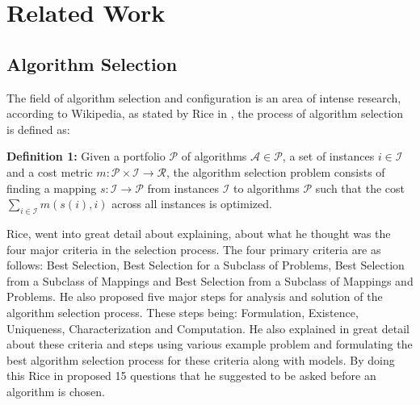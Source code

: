 \fi

\section{Related Work}

\subsection*{Algorithm Selection}

The field of algorithm selection and configuration is an area of intense research, according to Wikipedia, as stated by Rice in \citep{rice197665}, the process of algorithm selection is defined as:
\newline

\textbf{Definition 1:} Given a portfolio ${\displaystyle{\mathcal{P}}}$ of algorithms ${\displaystyle{\mathcal{A}} \in {\mathcal{P}}}$, a set of instances ${\displaystyle{i \in {\mathcal{I}}}}$ and a cost metric ${\displaystyle{m:{\mathcal{P}} \times {\mathcal{I}} \to \mathcal{R}}}$, the algorithm selection problem consists of finding a mapping ${\displaystyle s:{\mathcal {I}}\to {\mathcal {P}}}$ from instances ${\displaystyle {\mathcal {I}}}$ to algorithms ${\displaystyle {\mathcal {P}}}$ such that the cost ${\displaystyle \sum _{i\in {\mathcal {I}}}m(s(i),i)}$ across all instances is optimized.
\newline

Rice, went into great detail about explaining, about what he thought was the four major criteria in the selection process. The four primary criteria are as follows: Best Selection, Best Selection for a Subclass of Problems, Best Selection from a Subclass of Mappings and Best Selection from a Subclass of Mappings and Problems. He also proposed five major steps for analysis and solution of the algorithm selection process. These steps being: Formulation, Existence, Uniqueness, Characterization and Computation. He also explained in great detail about these criteria and steps using various example problem and formulating the best algorithm selection process for these criteria along with models. By doing this Rice in \citep{rice197665} proposed 15 questions that he suggested to be asked before an algorithm is chosen.


